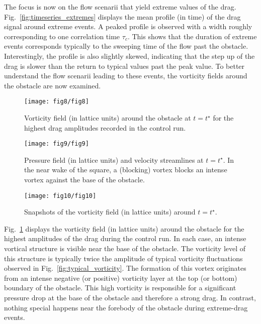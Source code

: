 %
The focus is now on the flow scenarii that yield extreme values of the drag. 
Fig.~\ref{fig:timeseries_extremes} displays the mean profile (in time) of the drag signal around extreme events. A peaked profile is observed with a width roughly corresponding to one correlation time $\tau_c$. This shows that the duration of extreme events corresponds typically to the sweeping time of the flow past the obstacle. 
Interestingly, the profile is also slightly skewed, indicating that the step up of the drag is slower than the return to typical values past the peak value.
To better understand the flow scenarii leading to these events, the vorticity fields around the obstacle are now examined.

\begin{figure}
	\centering
	\texttt{[image: fig8/fig8]}
	\caption{\label{fig:top_4_events_vorticity} Vorticity field (in lattice units) around the obstacle at $t=t^{\star}$ for the highest drag amplitudes recorded in the control run.
	}
\end{figure}

\begin{figure}
	\centering
	\texttt{[image: fig9/fig9]}
	\caption{\label{fig:density+streamlines} Pressure field (in lattice units) and velocity streamlines at $t=t^{\star}$. In the near wake of the square, a (blocking) vortex blocks an intense vortex against the base of the obstacle.}
\end{figure}

\begin{figure}
	\centering
	\texttt{[image: fig10/fig10]}
	\caption{\label{fig:vorticity_dynamics} Snapshots of the vorticity field (in lattice units)  around $t=t^{\star}$.}
\end{figure}
%
Fig.~\ref{fig:top_4_events_vorticity} displays the vorticity field (in lattice units) around the obstacle for the highest amplitudes of the drag during the control run.
%
In each case, an intense vortical structure is visible near the base of the obstacle.
The vorticity level of this structure is typically twice the amplitude of typical vorticity fluctuations observed in Fig.~\ref{fig:typical_vorticity}.
The formation of this vortex originates from an intense negative (or positive) vorticity layer at the top (or bottom) boundary of the obstacle. 
%
This high vorticity is responsible for a significant pressure drop at the base of the obstacle and therefore a strong drag.
In contrast, nothing special happens near the forebody of the obstacle during extreme-drag events.  


